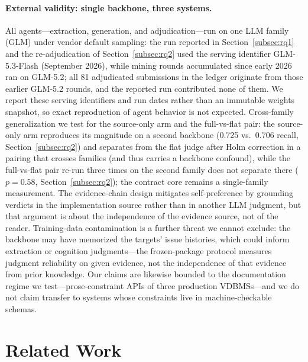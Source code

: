 \documentclass[acmsmall,screen,review,anonymous]{acmart}
\begin{document}
\paragraph{External validity: single backbone, three systems.}
All agents---extraction, generation, and adjudication---run on one LLM family (GLM) under vendor default sampling: the run reported in Section~\ref{subsec:rq1} and the re-adjudication of Section~\ref{subsec:rq2} used the serving identifier GLM-5.3-Flash (September 2026), while mining rounds accumulated since early 2026 ran on GLM-5.2; all 81 adjudicated submissions in the ledger originate from those earlier GLM-5.2 rounds, and the reported run contributed none of them. We report these serving identifiers and run dates rather than an immutable weights snapshot, so exact reproduction of agent behavior is not expected. Cross-family generalization we test for the source-only arm and the full-vs-flat pair: the source-only arm reproduces its magnitude on a second backbone (0.725 vs.\ 0.706 recall, Section~\ref{subsec:rq2}) and separates from the flat judge after Holm correction in a pairing that crosses families (and thus carries a backbone confound), while the full-vs-flat pair re-run three times on the second family does not separate there ($p{=}0.58$, Section~\ref{subsec:rq2}); the contract core remains a single-family measurement. The evidence-chain design mitigates self-preference by grounding verdicts in the implementation source rather than in another LLM judgment, but that argument is about the independence of the evidence source, not of the reader. Training-data contamination is a further threat we cannot exclude: the backbone may have memorized the targets' issue histories, which could inform extraction or cognition judgments---the frozen-package protocol measures judgment reliability on given evidence, not the independence of that evidence from prior knowledge. Our claims are likewise bounded to the documentation regime we test---prose-constraint APIs of three production VDBMSs---and we do not claim transfer to systems whose constraints live in machine-checkable schemas.

\section{Related Work}
\label{sec:related}
\end{document}
